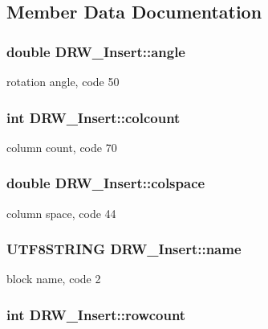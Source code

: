 \subsection{Member Data Documentation}
\hypertarget{classDRW__Insert_ad685a40847d4a5a8458ecaff2ccc4f3d}{
\subsubsection[{angle}]{\setlength{\rightskip}{0pt plus 5cm}double D\-R\-W\-\_\-\-Insert\-::angle}}\label{classDRW__Insert_ad685a40847d4a5a8458ecaff2ccc4f3d}
rotation angle, code 50 \hypertarget{classDRW__Insert_acd0f0491349b2159c6009634f883c3e7}{
\subsubsection[{colcount}]{\setlength{\rightskip}{0pt plus 5cm}int D\-R\-W\-\_\-\-Insert\-::colcount}}\label{classDRW__Insert_acd0f0491349b2159c6009634f883c3e7}
column count, code 70 \hypertarget{classDRW__Insert_a4fe4d62a16d3288286004aa8dd49acb6}{
\subsubsection[{colspace}]{\setlength{\rightskip}{0pt plus 5cm}double D\-R\-W\-\_\-\-Insert\-::colspace}}\label{classDRW__Insert_a4fe4d62a16d3288286004aa8dd49acb6}
column space, code 44 \hypertarget{classDRW__Insert_aac767b55f89a1ba2f95a01573dde4302}{
\subsubsection[{name}]{\setlength{\rightskip}{0pt plus 5cm}U\-T\-F8\-S\-T\-R\-I\-N\-G D\-R\-W\-\_\-\-Insert\-::name}}\label{classDRW__Insert_aac767b55f89a1ba2f95a01573dde4302}
block name, code 2 \hypertarget{classDRW__Insert_ac9bc5494805108fd83f5e1851d12b90b}{
\subsubsection[{rowcount}]{\setlength{\rightskip}{0pt plus 5cm}int D\-R\-W\-\_\-\-Insert\-::rowcount}}\label{classDRW__Insert_ac9bc5494805108fd83f5e1851d12b90b}
